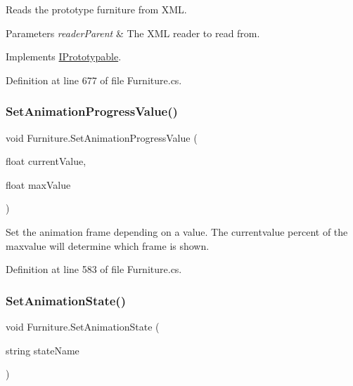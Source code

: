 Reads the prototype furniture from X\+ML. 


\begin{DoxyParams}{Parameters}
{\em reader\+Parent} & The X\+ML reader to read from.\\
\hline
\end{DoxyParams}


Implements \hyperlink{interface_i_prototypable_a024d752c4be655a7166db5718f1fad6a}{I\+Prototypable}.



Definition at line 677 of file Furniture.\+cs.

\mbox{\label{class_furniture_a3cd1d79bc68f11708bca068e684385fd}} 
\subsubsection{\texorpdfstring{Set\+Animation\+Progress\+Value()}{SetAnimationProgressValue()}}
{\footnotesize\ttfamily void Furniture.\+Set\+Animation\+Progress\+Value (\begin{DoxyParamCaption}\item[{float}]{current\+Value,  }\item[{float}]{max\+Value }\end{DoxyParamCaption})}



Set the animation frame depending on a value. The currentvalue percent of the maxvalue will determine which frame is shown. 



Definition at line 583 of file Furniture.\+cs.

\mbox{\label{class_furniture_a3210d7837b7568a37f3f3f2f70c58d98}} 
\subsubsection{\texorpdfstring{Set\+Animation\+State()}{SetAnimationState()}}
{\footnotesize\ttfamily void Furniture.\+Set\+Animation\+State (\begin{DoxyParamCaption}\item[{string}]{state\+Name }\end{DoxyParamCaption})}



